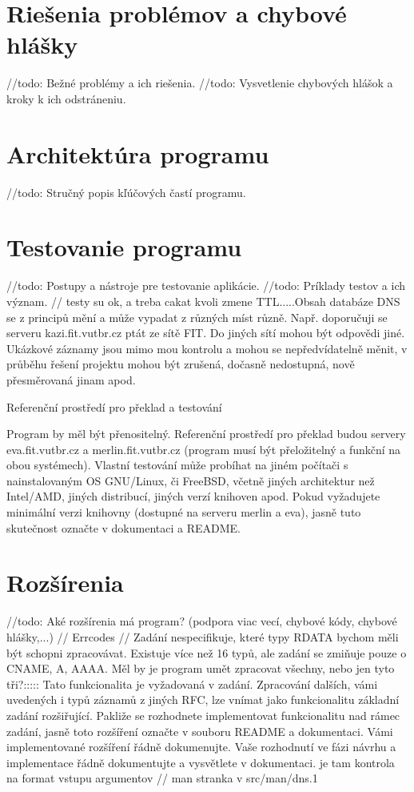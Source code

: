 \documentclass[a4paper, 11pt]{article}
\begin{document}
	\section{Riešenia problémov a chybové hlášky}
	//todo: Bežné problémy a ich riešenia.
	//todo: Vysvetlenie chybových hlášok a kroky k ich odstráneniu.
	
	\section{Architektúra programu}
	//todo: Stručný popis kľúčových častí programu.

	\section{Testovanie programu}
	//todo: Postupy a nástroje pre testovanie aplikácie.
	//todo: Príklady testov a ich význam.
	// testy su ok, a treba cakat kvoli zmene TTL.....Obsah databáze DNS se z principů mění a může vypadat z různých míst různě. Např. doporučuji se serveru kazi.fit.vutbr.cz ptát ze sítě FIT. Do jiných sítí mohou být odpovědi jiné. Ukázkové záznamy jsou mimo mou kontrolu a mohou se nepředvídatelně měnit, v průběhu řešení projektu mohou být zrušená, dočasně nedostupná, nově přesměrovaná jinam apod.
	
	Referenční prostředí pro překlad a testování

	Program by měl být přenositelný. Referenční prostředí pro překlad budou servery eva.fit.vutbr.cz a merlin.fit.vutbr.cz (program musí být přeložitelný a funkční na obou systémech). Vlastní testování může probíhat na jiném počítači s nainstalovaným OS GNU/Linux, či FreeBSD, včetně jiných architektur než Intel/AMD, jiných distribucí, jiných verzí knihoven apod. Pokud vyžadujete minimální verzi knihovny (dostupné na serveru merlin a eva), jasně tuto skutečnost označte v dokumentaci a README.


	\section{Rozšírenia}
	//todo: Aké rozšírenia má program? (podpora viac vecí, chybové kódy, chybové hlášky,...)
	// Errcodes
	// Zadání nespecifikuje, které typy RDATA bychom měli být schopni zpracovávat. Existuje více než 16 typů, ale zadání se zmiňuje pouze o CNAME, A, AAAA. Měl by je program umět zpracovat všechny, nebo jen tyto tři?:::::	Tato funkcionalita je vyžadovaná v zadání. Zpracování dalších, vámi uvedených i typů záznamů z jiných RFC, lze vnímat jako funkcionalitu základní zadání rozšiřující. Pakliže se rozhodnete implementovat funkcionalitu nad rámec zadání, jasně toto rozšíření označte v souboru README a dokumentaci. Vámi implementované rozšíření řádně dokumenujte. Vaše rozhodnutí ve fázi návrhu a implementace řádně dokumentujte a vysvětlete v dokumentaci.
	je tam kontrola na format vstupu argumentov
	// man stranka v src/man/dns.1
\end{document}
